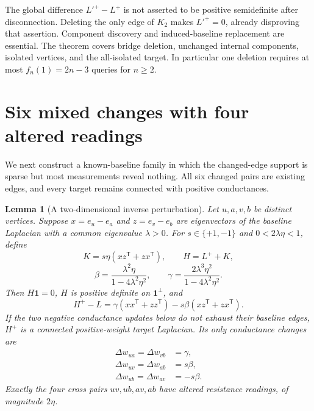 \documentclass[11pt,letterpaper]{article}
\newtheorem{lemma}[theorem]{Lemma}
\newcommand{\one}{\mathbf 1}
\begin{document}
The global difference $L'^+-L^+$ is not asserted to be positive semidefinite after disconnection. Deleting the only edge of $K_2$ makes $L'^+=0$, already disproving that assertion. Component discovery and induced-baseline replacement are essential. The theorem covers bridge deletion, unchanged internal components, isolated vertices, and the all-isolated target. In particular one deletion requires at most $f_n(1)=2n-3$ queries for $n\ge2$.

\section{Six mixed changes with four altered readings}
We next construct a known-baseline family in which the changed-edge support is sparse but most measurements reveal nothing. All six changed pairs are existing edges, and every target remains connected with positive conductances.

\begin{lemma}[A two-dimensional inverse perturbation]\label{lem:construction}
Let $u,a,v,b$ be distinct vertices. Suppose $x=e_u-e_a$ and $z=e_v-e_b$ are eigenvectors of the baseline Laplacian with a common eigenvalue $\lambda>0$. For $s\in\{+1,-1\}$ and $0<2\lambda\eta<1$, define
\[
 K=s\eta(xz^{\mathsf T}+zx^{\mathsf T}),\qquad H=L^++K,
\]
\[
 \beta=\frac{\lambda^2\eta}{1-4\lambda^2\eta^2},\qquad
 \gamma=\frac{2\lambda^3\eta^2}{1-4\lambda^2\eta^2}.
\]
Then $H\one=0$, $H$ is positive definite on $\one^\perp$, and
\[
 H^+-L=\gamma(xx^{\mathsf T}+zz^{\mathsf T})
           -s\beta(xz^{\mathsf T}+zx^{\mathsf T}).
\]
If the two negative conductance updates below do not exhaust their baseline edges, $H^+$ is a connected positive-weight target Laplacian. Its only conductance changes are
\[
 \begin{aligned}
 \Delta w_{ua}=\Delta w_{vb}&=\gamma,\\
 \Delta w_{uv}=\Delta w_{ab}&=s\beta,\\
 \Delta w_{ub}=\Delta w_{av}&=-s\beta.
 \end{aligned}
\]
Exactly the four cross pairs $uv,ub,av,ab$ have altered resistance readings, of magnitude $2\eta$.
\end{lemma}
\end{document}
